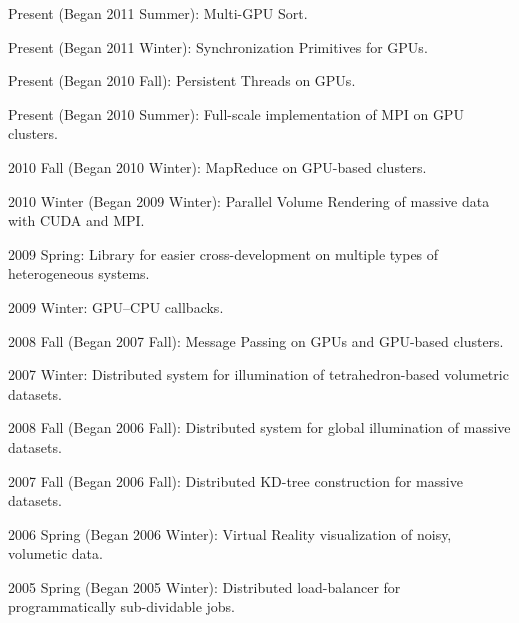 Present (Began 2011 Summer): Multi-GPU Sort.

Present (Began 2011 Winter): Synchronization Primitives for GPUs.

Present (Began 2010 Fall): Persistent Threads on GPUs.

Present (Began 2010 Summer): Full-scale implementation of MPI on GPU clusters.

2010 Fall (Began 2010 Winter): MapReduce on GPU-based clusters.

2010 Winter (Began 2009 Winter): Parallel Volume Rendering of massive data with CUDA and MPI.

2009 Spring: Library for easier cross-development on multiple types of heterogeneous systems.

2009 Winter: GPU--CPU callbacks.

2008 Fall (Began 2007 Fall): Message Passing on GPUs and GPU-based clusters.

2007 Winter: Distributed system for illumination of tetrahedron-based volumetric datasets.

2008 Fall (Began 2006 Fall): Distributed system for global illumination of massive datasets.

2007 Fall (Began 2006 Fall): Distributed KD-tree construction for massive datasets.

2006 Spring (Began 2006 Winter): Virtual Reality visualization of noisy, volumetic data.

2005 Spring (Began 2005 Winter): Distributed load-balancer for programmatically sub-dividable jobs.

